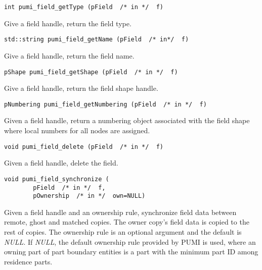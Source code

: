 \begin{verbatim}
int pumi_field_getType (pField  /* in */  f)
\end{verbatim}\vspace{-.5cm}\hspace{1cm}
Give a field  handle, return the field type. 

\begin{verbatim}
std::string pumi_field_getName (pField  /* in*/  f)
\end{verbatim}\vspace{-.5cm}\hspace{1cm}
Give a field  handle, return the field name.

\begin{verbatim}
pShape pumi_field_getShape (pField  /* in */  f)
\end{verbatim}\vspace{-.5cm}\hspace{1cm}
Give a field  handle, return the field shape handle.

\begin{verbatim}
pNumbering pumi_field_getNumbering (pField  /* in */  f)
\end{verbatim}\vspace{-.5cm}\hspace{1cm}
Given a field handle, return a numbering object associated with the field shape where local numbers for all nodes are assigned.

\begin{verbatim}
void pumi_field_delete (pField  /* in */  f)
\end{verbatim}\vspace{-.5cm}\hspace{1cm}
Given a field handle, delete the field.

\begin{verbatim}
void pumi_field_synchronize (
        pField  /* in */  f,
        pOwnership  /* in */  own=NULL)
\end{verbatim}\vspace{-.5cm}\hspace{1cm}
Given a field handle and an ownership rule, synchronize field data between remote, ghost and matched copies. The owner copy's field data is copied to the rest of copies. The ownership rule is an optional argument and the default is \emph{NULL}. If \emph{NULL}, the default ownership rule provided by PUMI is used, where an owning part of part boundary entities is a part with the minimum part ID among residence parts.

